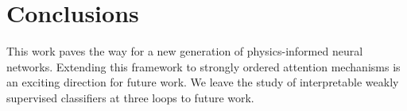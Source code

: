 \section{Conclusions}\label{sec:conclusions}

This work paves the way for a new generation of physics-informed neural
networks. Extending this framework to strongly ordered attention
mechanisms is an exciting direction for future work. We leave the study
of interpretable weakly supervised classifiers at three loops to future
work.

